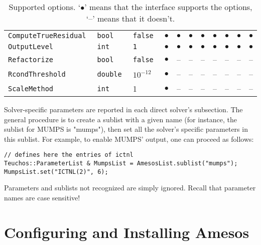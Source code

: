 \documentclass[11pt]{SANDreport}
\newcommand{\amesos}{{\sc Amesos}}
\begin{document}
\begin{sidewaystable}[tbhp]
\begin{tabular}{| p{5cm} | p{2cm} | p{2cm} | c | c | c
      | c | c | c | c | c |}
    \tt ComputeTrueResidual & \tt bool   & \tt false  & $\bullet$ & $\bullet$
    & $\bullet$ & $\bullet$ &  $\bullet$ & $\bullet$ & $\bullet$  & $\bullet$\\
    \tt OutputLevel         & \tt int    & \tt 1      & $\bullet$ & $\bullet$
    & $\bullet$ & $\bullet$ &  $\bullet$ & $\bullet$ & $\bullet$  & $\bullet$\\
    \tt Refactorize         & \tt bool   & \tt false  & $\bullet$ & -- & -- & -- &  -- & -- & -- & -- \\
    \tt RcondThreshold      & \tt double & $10^{-12}$ & $\bullet$ & -- & -- & -- &  -- & -- & -- & -- \\
    \tt ScaleMethod         & \tt int    & 1          & $\bullet$ & -- & -- & -- &  -- & -- & -- & -- \\
    \hline
  \end{tabular}
  \caption{Supported options. `$\bullet$' means that the interface
    supports the options, `--' means that it doesn't.}
  \label{tab:options}
\end{sidewaystable}

Solver-specific parameters are reported in each direct solver's subsection.
The general procedure is to create a sublist with a given name (for
instance, the sublist for MUMPS is "mumps"), then set all the
solver's specific parameters in this sublist. 
For example, to enable MUMPS'
output, one can proceed as follows:
\begin{verbatim}
// defines here the entries of ictnl
Teuchos::ParameterList & MumpsList = AmesosList.sublist("mumps");
MumpsList.set("ICTNL(2)", 6);
\end{verbatim}
Parameters and sublists not recognized are simply ignored. Recall that
parameter names are case sensitive!

\section{Configuring and Installing \amesos}
\label{sec:configuration}
\end{document}
